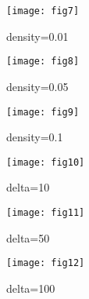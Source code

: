 \begin{figure}[p]
\texttt{[image: fig7]}
\caption{density=0.01}\label{fig:mf1}
\end{figure}
\begin{figure}[p]
\texttt{[image: fig8]}
\caption{density=0.05}\label{fig:mf2}
\end{figure}
\begin{figure}[p]
\texttt{[image: fig9]}
\caption{density=0.1}\label{fig:mf3}
\end{figure}
\begin{figure}[p]
\texttt{[image: fig10]}
\caption{delta=10}\label{fig:mf4}
\end{figure}
\begin{figure}[p]
\texttt{[image: fig11]}
\caption{delta=50}\label{fig:mf5}
\end{figure}
\begin{figure}[p]
\texttt{[image: fig12]}
\caption{delta=100}\label{fig:mf6}
\end{figure}
